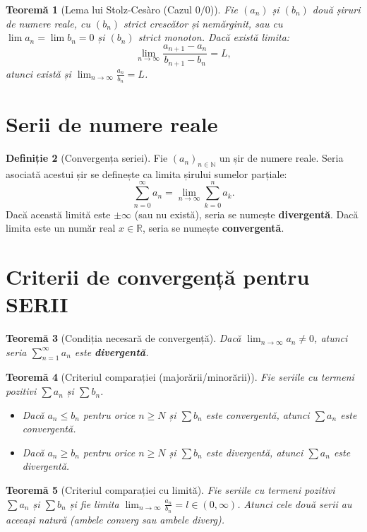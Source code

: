 \documentclass[11pt,a4paper]{article}
\theoremstyle{definition}
\newtheorem{definition}{Definiție}[section]
\theoremstyle{plain}
\newtheorem{theorem}[definition]{Teoremă}
\theoremstyle{remark}
\newcommand{\R}{\mathbb{R}}
\newcommand{\N}{\mathbb{N}}
\begin{document}
\begin{theorem}[Lema lui Stolz-Cesàro (Cazul $0/0$)]
    Fie $(a_n)$ și $(b_n)$ două șiruri de numere reale, cu $(b_n)$ strict crescător și nemărginit, sau cu $\lim a_n = \lim b_n = 0$ și $(b_n)$ strict monoton. Dacă există limita:
    \[
        \lim_{n \to \infty} \frac{a_{n+1} - a_n}{b_{n+1} - b_n} = L,
    \]
    atunci există și $\lim_{n \to \infty} \frac{a_n}{b_n} = L$.
\end{theorem}

\section{Serii de numere reale}

\begin{definition}[Convergența seriei]
    Fie $(a_n)_{n \in \N}$ un șir de numere reale. Seria asociată acestui șir se definește ca limita șirului sumelor parțiale:
    \[
        \sum_{n=0}^\infty a_n = \lim_{n \to \infty} \sum_{k=0}^n a_k.
    \]
    Dacă această limită este $\pm \infty$ (sau nu există), seria se numește \textbf{divergentă}. Dacă limita este un număr real $x \in \R$, seria se numește \textbf{convergentă}.
\end{definition}

\section{Criterii de convergență pentru SERII}

\begin{theorem}[Condiția necesară de convergență]
    Dacă $\lim_{n \to \infty} a_n \neq 0$, atunci seria $\sum_{n=1}^\infty a_n$ este \textbf{divergentă}.
\end{theorem}

\begin{theorem}[Criteriul comparației (majorării/minorării)]
    Fie seriile cu termeni pozitivi $\sum a_n$ și $\sum b_n$.
    \begin{itemize}
        \item Dacă $a_n \leq b_n$ pentru orice $n \ge N$ și $\sum b_n$ este convergentă, atunci $\sum a_n$ este convergentă.
        \item Dacă $a_n \geq b_n$ pentru orice $n \ge N$ și $\sum b_n$ este divergentă, atunci $\sum a_n$ este divergentă.
    \end{itemize}
\end{theorem}

\begin{theorem}[Criteriul comparației cu limită]
    Fie seriile cu termeni pozitivi $\sum a_n$ și $\sum b_n$ și fie limita $\lim_{n \to \infty} \frac{a_n}{b_n} = l \in (0, \infty)$. Atunci cele două serii au aceeași natură (ambele converg sau ambele diverg).
\end{theorem}
\end{document}
